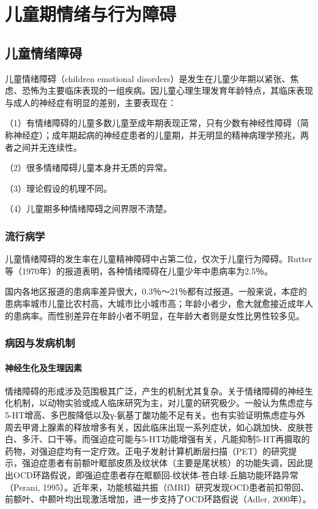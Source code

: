 \chapter{儿童期情绪与行为障碍}

\section{儿童情绪障碍}

儿童情绪障碍（children emotional
disorders）是发生在儿童少年期以紧张、焦虑、恐怖为主要临床表现的一组疾病。因儿童心理生理发育年龄特点，其临床表现与成人的神经症有明显的差别，主要表现在：

（1）有情绪障碍的儿童多数儿童至成年期表现正常，只有少数有神经性障碍（简称神经症）；成年期起病的神经症患者的儿童期，并无明显的精神病理学预兆，两者之间并无连续性。

（2）很多情绪障碍儿童本身并无质的异常。

（3）理论假设的机理不同。

（4）儿童期多种情绪障碍之间界限不清楚。

\subsection{流行病学}

儿童情绪障碍的发生率在儿童精神障碍中占第二位，仅次于儿童行为障碍。Rutter等（1970年）的报道表明，各种情绪障碍在儿童少年中患病率为2.5％。

国内各地区报道的患病率差异很大，0.3％～21％都有过报道。一般来说，本症的患病率城市儿童比农村高，大城市比小城市高；年龄小者少，愈大就愈接近成年人的患病率。而性别差异在年龄小者不明显，在年龄大者则是女性比男性较多见。

\subsection{病因与发病机制}

\subsubsection{神经生化及生理因素}

情绪障碍的形成涉及范围极其广泛，产生的机制尤其复杂。关于情绪障碍的神经生化机制，以动物实验或成人临床研究为主，对儿童的研究极少。一般认为焦虑症与5-HT增高、多巴胺降低以及γ-氨基丁酸功能不足有关。也有实验证明焦虑症与外周去甲肾上腺素的释放增多有关，因此临床出现一系列症状，如心跳加快、皮肤苍白、多汗、口干等。而强迫症可能与5-HT功能增强有关，凡能抑制5-HT再摄取的药物，对强迫症均有一定疗效。正电子发射计算机断层扫描（PET）的研究提示，强迫症患者有前额叶眶部皮质及纹状体（主要是尾状核）的功能失调，因此提出OCD环路假说，即强迫症患者存在眶额回-纹状体-苍白球-丘脑功能环路异常（Perani,
1995）。近年来，功能核磁共振（fMRI）研究发现OCD患者前扣带回、前额叶、中颞叶均出现激活增加，进一步支持了OCD环路假说（Adler,
2000年）。

